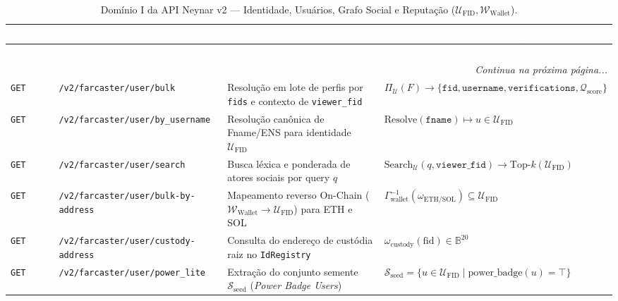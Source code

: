 \documentclass[11pt,a4paper]{article}
\begin{document}
\renewcommand{\arraystretch}{1.22}
\begin{longtable}{@{}p{1.15cm}>{\raggedright\arraybackslash}p{5.65cm}>{\raggedright\arraybackslash}p{4.15cm}>{\raggedright\arraybackslash}p{4.85cm}@{}}
\caption{Domínio I da API Neynar v2 --- Identidade, Usuários, Grafo Social e Reputação ($\mathcal{U}_{\text{FID}}, \mathcal{W}_{\text{Wallet}}$).}\label{tab:neynar_users}\\
\toprule
\rowcolor{fcDeep}
\textcolor{white}{\textbf{Método}} & \textcolor{white}{\textbf{Endpoint Neynar v2}} & \textcolor{white}{\textbf{Papel na Folksonomia}} & \textcolor{white}{\textbf{Operador Simbólico / Campos-Chave}} \\
\midrule
\endfirsthead
\toprule
\rowcolor{fcDeep}
\textcolor{white}{\textbf{Método}} & \textcolor{white}{\textbf{Endpoint Neynar v2}} & \textcolor{white}{\textbf{Papel na Folksonomia}} & \textcolor{white}{\textbf{Operador Simbólico / Campos-Chave}} \\
\midrule
\endhead
\midrule
\multicolumn{4}{r}{\footnotesize\emph{Continua na próxima página...}} \\
\bottomrule
\endfoot
\bottomrule
\endlastfoot
\texttt{GET} & \texttt{/v2/farcaster/user/bulk} & Resolução em lote de perfis por \texttt{fids} e contexto de \texttt{viewer\_fid} & $\Pi_{\mathcal{U}}(F) \to \{\texttt{fid}, \texttt{username}, \texttt{verifications}, \mathcal{Q}_{\text{score}}\}$ \\
\rowcolor{slateBg}
\texttt{GET} & \texttt{/v2/farcaster/user/by\_username} & Resolução canônica de Fname/ENS para identidade $\mathcal{U}_{\text{FID}}$ & $\text{Resolve}(\texttt{fname}) \mapsto u \in \mathcal{U}_{\text{FID}}$ \\
\texttt{GET} & \texttt{/v2/farcaster/user/search} & Busca léxica e ponderada de atores sociais por query $q$ & $\text{Search}_{\mathcal{U}}(q, \texttt{viewer\_fid}) \to \text{Top-}k(\mathcal{U}_{\text{FID}})$ \\
\rowcolor{slateBg}
\texttt{GET} & \texttt{/v2/farcaster/user/bulk-by-address} & Mapeamento reverso On-Chain ($\mathcal{W}_{\text{Wallet}} \to \mathcal{U}_{\text{FID}}$) para ETH e SOL & $\Gamma_{\text{wallet}}^{-1}(\omega_{\text{ETH/SOL}}) \subseteq \mathcal{U}_{\text{FID}}$ \\
\texttt{GET} & \texttt{/v2/farcaster/user/custody-address} & Consulta do endereço de custódia raiz no \texttt{IdRegistry} & $\omega_{\text{custody}}(\text{fid}) \in \mathbb{B}^{20}$ \\
\rowcolor{slateBg}
\texttt{GET} & \texttt{/v2/farcaster/user/power\_lite} & Extração do conjunto semente $\mathcal{S}_{\text{seed}}$ (\emph{Power Badge Users}) & $\mathcal{S}_{\text{seed}} = \{u \in \mathcal{U}_{\text{FID}} \mid \text{power\_badge}(u)=\top\}$ \\

\end{longtable}
\end{document}
